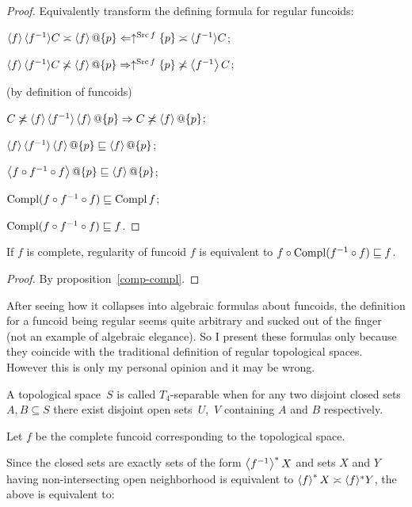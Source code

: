 \begin{proof}
Equivalently transform the defining formula for regular funcoids:

$\left\langle f\right\rangle \langle f^{- 1} \rangle C \asymp \left\langle f\right\rangle
@\{ p \} \Leftarrow \uparrow^{\operatorname{Src} f} \{ p \}
\asymp \langle f^{- 1} \rangle C$;

$\left\langle f\right\rangle \langle f^{- 1} \rangle C \not\asymp \left\langle f\right\rangle
@\{ p \} \Rightarrow \uparrow^{\operatorname{Src} f} \{ p \} \not\asymp \left\langle f^{-1}\right\rangle C$;

(by definition of funcoids)

$C \not\asymp \left\langle f\right\rangle \langle f^{- 1} \rangle \left\langle f\right\rangle
@\{ p \} \Rightarrow C \not\asymp \left\langle f\right\rangle
@\{ p \}$;

$\supfun{f} \langle f^{- 1} \rangle \supfun{f}
@\{ p \} \sqsubseteq \supfun{f}@\{ p \}$;

$\left\langle f \circ f^{- 1} \circ f\right\rangle @\{ p \}
\sqsubseteq \left\langle f\right\rangle @\{ p \}$;

$\operatorname{Compl} (f \circ f^{- 1} \circ f) \sqsubseteq \operatorname{Compl} f$;

$\operatorname{Compl} (f \circ f^{- 1} \circ f) \sqsubseteq f$.
\end{proof}

\begin{prop}
If $f$ is complete, regularity of funcoid $f$ is equivalent to $f \circ
\operatorname{Compl} (f^{- 1} \circ f) \sqsubseteq f$.
\end{prop}

\begin{proof}
  By proposition~\ref{comp-compl}.
\end{proof}

\begin{rem}
After seeing how it collapses into algebraic formulas about funcoids, the
definition for a funcoid being regular seems quite arbitrary and sucked out of
the finger (not an example of algebraic elegance). So I present these formulas
only because they coincide with the traditional definition of regular
topological spaces. However this is only my personal opinion and it may be
wrong.
\end{rem}


A topological space~$S$ is called $T_4$-separable when for any two disjoint closed sets $A,B\subseteq S$
there exist disjoint open sets~$U$,~$V$ containing $A$ and $B$ respectively.

Let $f$ be the complete funcoid corresponding to the topological space.

Since the closed sets are exactly sets of the form $\left\langle f^{- 1}\right\rangle ^{\ast} X$ and sets $X$ and $Y$ having non-intersecting open
neighborhood is equivalent to $\left\langle f\right\rangle ^{\ast} X \asymp \langle f
\rangle^{\ast} Y$, the above is equivalent to:


